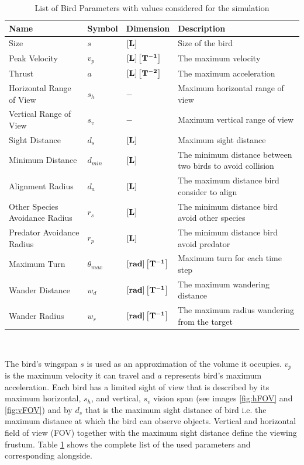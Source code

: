 \begin{table}
	\centering
	\begin{adjustbox}{width=1\textwidth}
	\begin{tabular}{|l| l| l| l|}
		\hline
		Name & Symbol & Dimension & Description\\
		\hline
		Size & $s$ & $\left[\vb{L}\right]$ & Size of the bird \\
		Peak Velocity & \(v_p\)  & $\left[\vb{L}\right]\left[\vb{T^{-1}}\right]$  & The maximum velocity\\
		Thrust 	& \(a\) & $\left[\vb{L}\right]\left[\vb{T^{-2}}\right]$  & The maximum acceleration\\
		Horizontal Range of View & \(s_h\) & \(-\) & Maximum horizontal range of view\\ 
		Vertical Range of View & \(s_v\) 	& \(-\) & Maximum vertical range of view\\
		Sight Distance & \(d_s\) & $\left[\vb{L}\right]$ & Maximum sight distance\\
		Minimum Distance & \(d_{min}\) & $\left[\vb{L}\right]$  & The minimum distance between two birds to avoid collision\\
		Alignment Radius & \(d_a\) & $\left[\vb{L}\right]$  & The maximum distance bird consider to align\\
		Other Species Avoidance Radius & \(r_s\) & $\left[\vb{L}\right]$ & The minimum distance bird avoid other species\\
		Predator Avoidance Radius & \(r_p\) & $\left[\vb{L}\right]$ & The minimum distance bird avoid predator\\
		Maximum Turn & \(\theta_{max}\) & \( \left[\vb{rad}\right]\left[\vb{T^{-1}}\right] \) & Maximum turn for each time step\\
		Wander Distance & \(w_d\) & \( \left[\vb{rad}\right]\left[\vb{T^{-1}}\right] \)& The maximum wandering distance\\
		Wander Radius & \(w_r\)	& \( \left[\vb{rad}\right]\left[\vb{T^{-1}}\right] \) & The maximum radius wandering from the target\\
		\hline
	\end{tabular}
\end{adjustbox}
	\hfill \\
	\caption[List of Bird Parameters]{List of Bird Parameters with values considered for the simulation}
	\label{tab:BirdParameters}
\end{table}


The  bird's wingspan \(s\) is used as an approximation of the volume
it occupies. \(v_p\) is the maximum velocity it can travel
and \(a\) represents bird's maximum acceleration.
Each bird has a limited sight of view that is described by its maximum
horizontal, \(s_h\), and vertical, \(s_v\) vision span (see images
\ref{fig:hFOV} and \ref{fig:vFOV}) and by \(d_s\) that is the maximum sight
distance of bird i.e. the maximum distance at which the bird can observe
objects.
Vertical and horizontal field of view (FOV) together with the maximum sight distance define the
viewing frustum. Table \ref{tab:BirdParameters} shows the complete list of the used
parameters and corresponding alongside.

